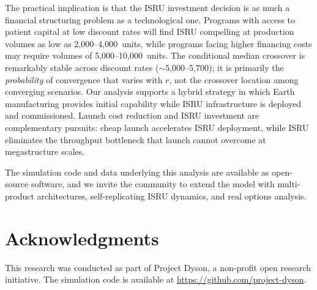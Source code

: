\documentclass[preprint,12pt]{elsarticle}
\begin{document}
The practical implication is that the ISRU investment decision is as much a financial structuring problem as a technological one. Programs with access to patient capital at low discount rates will find ISRU compelling at production volumes as low as 2{,}000--4{,}000~units, while programs facing higher financing costs may require volumes of 5{,}000--10{,}000~units. The conditional median crossover is remarkably stable across discount rates ($\sim$5{,}000--5{,}700); it is primarily the \emph{probability} of convergence that varies with $r$, not the crossover location among converging scenarios. Our analysis supports a hybrid strategy in which Earth manufacturing provides initial capability while ISRU infrastructure is deployed and commissioned. Launch cost reduction and ISRU investment are complementary pursuits: cheap launch accelerates ISRU deployment, while ISRU eliminates the throughput bottleneck that launch cannot overcome at megastructure scales.

The simulation code and data underlying this analysis are available as open-source software, and we invite the community to extend the model with multi-product architectures, self-replicating ISRU dynamics, and real options analysis.


\section*{Acknowledgments}

This research was conducted as part of Project Dyson, a non-profit open research initiative. The simulation code is available at \url{https://github.com/project-dyson}.
\end{document}
